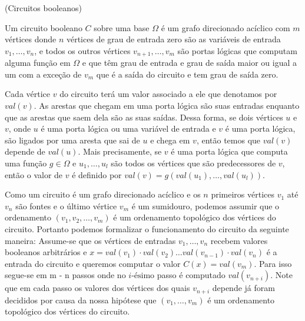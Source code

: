 \begin{defi} (Circuitos booleanos) \label{defi:boolcircuits}

Um circuito booleano $C$ sobre uma base $\Omega$ é um grafo direcionado acíclico com $m$ vértices donde $n$ vértices de grau de entrada zero são as variáveis de entrada $v_{1}, \dots, v_{n}$, e todos os outros vértices $v_{n + 1}, \dots, v_{m}$ são portas lógicas que computam alguma função em $\Omega$ e que têm grau de entrada e grau de saída maior ou igual a um com a exceção de $v_{m}$ que é a saída do circuito e tem grau de saída zero.

Cada vértice $v$ do circuito terá um valor associado a ele que denotamos por $val(v)$. As arestas que chegam em uma porta lógica são suas entradas enquanto que as arestas que saem dela são as suas saídas. Dessa forma, se dois vértices $u$ e $v$, onde $u$ é uma porta lógica ou uma variável de entrada e $v$ é uma porta lógica, são ligados por uma aresta que sai de $u$ e chega em $v$, então temos que $val(v)$ depende de $val(u)$. Mais precisamente, se $v$ é uma porta lógica que computa uma função $g \in \Omega$ e $u_{1}, \dots, u_{l}$ são todos os vértices que são predecessores de $v$, então o valor de $v$ é definido por $val(v) = g(val(u_{1}), \dots, val(u_{l}))$.

Como um circuito é um grafo direcionado acíclico e os $n$ primeiros vértices $v_{1}$ até $v_{n}$ são fontes e o último vértice $v_{m}$ é um sumidouro, podemos assumir que o ordenamento $(v_{1}, v_{2}, \dots, v_{m})$ é um ordenamento topológico dos vértices do circuito. Portanto podemos formalizar o funcionamento do circuito da seguinte maneira: Assume-se que os vértices de entradas $v_{1}, \dots, v_{n}$ recebem valores booleanos arbitrários e $x = val(v_{1})\cdot val(v_{2})\dots val(v_{n - 1})\cdot val(v_{n})$ é a entrada do circuito e queremos computar o valor $C(x) = val(v_{m})$. Para isso segue-se em m - n passos onde no $i\text{-ésimo}$ passo é computado $val(v_{n + i})$. Note que em cada passo os valores dos vértices dos quais $v_{n + i}$ depende já foram decididos por causa da nossa hipótese que $(v_{1}, \dots, v_{m})$ é um ordenamento topológico dos vértices do circuito.





\end{defi}
